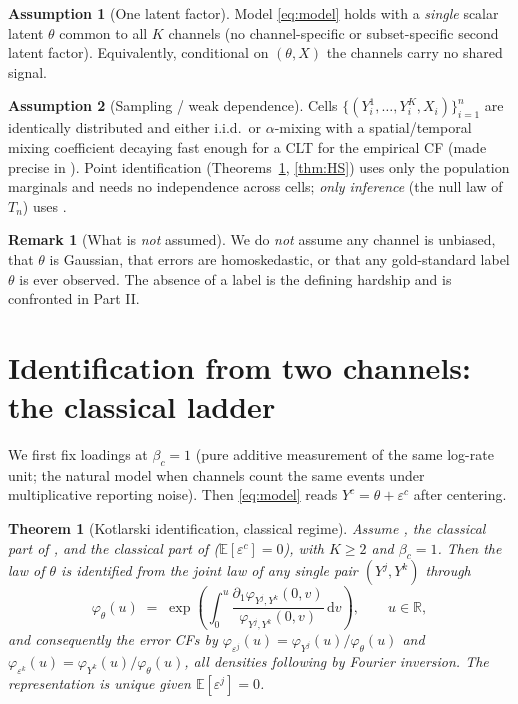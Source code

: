 \documentclass[11pt]{article}
\newtheorem{theorem}{Theorem}
\theoremstyle{definition}
\newtheorem{assumption}{Assumption}
\newtheorem{remark}{Remark}
\newcommand{\R}{\mathbb{R}}
\newcommand{\E}{\mathbb{E}}
\newcommand{\Th}{\theta}
\newcommand{\lat}{\Th}
\begin{document}
\begin{assumption}[One latent factor]\label{A4factor}
Model \eqref{eq:model} holds with a \emph{single} scalar latent $\lat$ common
to all $K$ channels (no channel-specific or subset-specific second latent
factor). Equivalently, conditional on $(\lat,X)$ the channels carry no shared
signal.
\end{assumption}

\begin{assumption}[Sampling / weak dependence]\label{A5samp}
Cells $\{(Y^1_i,\dots,Y^K_i,X_i)\}_{i=1}^n$ are identically distributed and
either i.i.d.\ or $\alpha$-mixing with a spatial/temporal mixing coefficient
decaying fast enough for a CLT for the empirical CF (made precise in
). Point identification (Theorems~\ref{thm:kotlarski},
\ref{thm:HS}) uses only the population marginals and needs no independence
across cells; \emph{only inference} (the null law of $T_n$) uses .
\end{assumption}

\begin{remark}[What is \emph{not} assumed]
We do \emph{not} assume any channel is unbiased, that $\lat$ is Gaussian, that
errors are homoskedastic, or that any gold-standard label $\lat$ is ever
observed. The absence of a label is the defining hardship and is confronted
in Part II.
\end{remark}

\section{Identification from two channels: the classical ladder}
\label{sec:kotlarski}

We first fix loadings at $\beta_c=1$ (pure additive measurement of the same
log-rate unit; the natural model when channels count the same events under
multiplicative reporting noise). Then \eqref{eq:model} reads
$Y^c=\lat+\varepsilon^c$ after centering.

\begin{theorem}[Kotlarski identification, classical regime]
\label{thm:kotlarski}
Assume , the classical part of , and the classical part of
 ($\E[\varepsilon^c]=0$), with $K\ge 2$ and $\beta_c=1$. Then the law
of $\lat$ is identified from the joint law of any single pair $(Y^j,Y^k)$
through
\begin{equation}\label{eq:kotlarski-id}
  \varphi_{\lat}(u)
  \;=\;
  \exp\!\left(\int_0^{u}
  \frac{\partial_1 \varphi_{Y^j,Y^k}(0,v)}{\varphi_{Y^j,Y^k}(0,v)}\,\mathrm{d}v
  \right),
  \qquad u\in\R,
\end{equation}
and consequently the error CFs by
$\varphi_{\varepsilon^j}(u)=\varphi_{Y^j}(u)/\varphi_{\lat}(u)$ and
$\varphi_{\varepsilon^k}(u)=\varphi_{Y^k}(u)/\varphi_{\lat}(u)$, all densities
following by Fourier inversion. The representation is unique given
$\E[\varepsilon^j]=0$.
\end{theorem}
\end{document}
